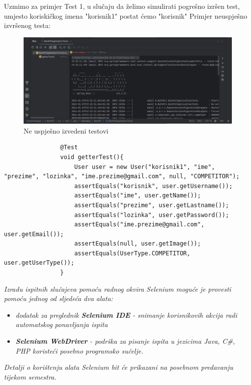 			Uzmimo za primjer Test 1, u slučaju da želimo simulirati pogrešno izršen test, umjesto koriskičkog imena "korisnik1" postat ćemo "korisnik"
			Primjer neuspješno izvršenog testa:
			\begin{figure}[H]
				\includegraphics[scale=0.6]{slike/test2}
				\centering
				\caption{Ne uspješno izvedeni testovi}
				\label{fig:neuspjeh}
			\end{figure}
			
			\begin{lstlisting}
				@Test
				void getterTest(){
					User user = new User("korisnik1", "ime", "prezime", "lozinka", "ime.prezime@gmail.com", null, "COMPETITOR");
					assertEquals("korisnik", user.getUsername());
					assertEquals("ime", user.getName());
					assertEquals("prezime", user.getLastname());
					assertEquals("lozinka", user.getPassword());
					assertEquals("ime.prezime@gmail.com", user.getEmail());
					assertEquals(null, user.getImage());
					assertEquals(UserType.COMPETITOR, user.getUserType());	
				}
			\end{lstlisting}
			
			
			 
			 \textit{Izradu ispitnih slučajeva pomoću radnog okvira Selenium moguće je provesti pomoću jednog od sljedeća dva alata:}
			 \begin{itemize}
			 	\item \textit{dodatak za preglednik \textbf{Selenium IDE} - snimanje korisnikovih akcija radi automatskog ponavljanja ispita	}
			 	\item \textit{\textbf{Selenium WebDriver} - podrška za pisanje ispita u jezicima Java, C\#, PHP koristeći posebno programsko sučelje.}
			 \end{itemize}
		 	\textit{Detalji o korištenju alata Selenium bit će prikazani na posebnom predavanju tijekom semestra.}
			
			\eject 
		
